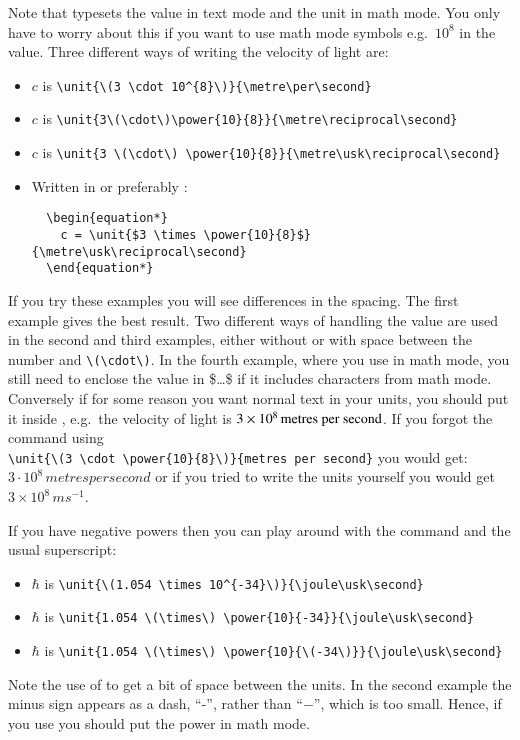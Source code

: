 Note that  typesets the value in text mode and the
unit in math mode. You only have to worry about this if you want to
use math mode symbols e.g.\ \(10^{8}\) in the value. Three different ways
of writing the velocity of light are:
\begin{itemize}\setlength{\itemsep}{0pt}\setlength{\parskip}{0pt}
\item \(c\) is \verb+\unit{\(3 \cdot 10^{8}\)}{\metre\per\second}+
\item \(c\) is
  \verb+\unit{3\(\cdot\)\power{10}{8}}{\metre\reciprocal\second}+
\item \(c\) is \verb+\unit{3 \(\cdot\) \power{10}{8}}{\metre\usk\reciprocal\second}+
\item Written in  or preferably :
\begin{verbatim}
  \begin{equation*}
    c = \unit{$3 \times \power{10}{8}$}{\metre\usk\reciprocal\second}
  \end{equation*}
\end{verbatim}
\end{itemize}
If you try these examples you will see differences in the spacing.
The first example gives the best result.
Two different ways of handling the value
are used in the second and third examples, either without or with space between
the number and \verb+\(\cdot\)+. In the fourth example, where you use
 in math mode, you still need to enclose the value in
\$\ldots\$ if it includes characters from math mode.  Conversely if for
some reason you want normal text in your units, you should put it
inside , e.g.\ the velocity of light is
\(\SI{3E8}{\text{metres per second}}\). If you forgot the
 command using\\
\verb+\unit{\(3 \cdot \power{10}{8}\)}{metres per second}+ you would
get:
\(3 \cdot 10^{8}\,metres per second\) or if you tried to write the units
yourself you would get \(3 \times 10^8\,m s^{-1}\).

If you have negative powers then you can play around with
the  command and the usual superscript:
\begin{itemize}
\item \(\hbar\) is \verb+\unit{\(1.054 \times 10^{-34}\)}{\joule\usk\second}+
\item \(\hbar\) is \verb+\unit{1.054 \(\times\) \power{10}{-34}}{\joule\usk\second}+
\item \(\hbar\) is \verb+\unit{1.054 \(\times\) \power{10}{\(-34\)}}{\joule\usk\second}+
\end{itemize}
Note the use of  to get a bit of space between the
units. In the second example the minus sign appears as a dash,
\enquote{-}, rather than \enquote{\(-\)}, which is too small. Hence, if you
use  you should put the power in math mode.

